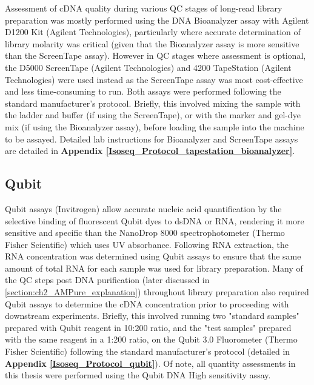 Assessment of cDNA quality during various QC stages of long-read library preparation was mostly performed using the DNA Bioanalyzer assay with Agilent D1200 Kit (Agilent Technologies), particularly where accurate determination of library molarity was critical (given that the Bioanalyzer assay is more sensitive than the ScreenTape assay). However in QC stages where assessment is optional, the D5000 ScreenTape (Agilent Technologies) and 4200 TapeStation (Agilent Technologies) were used instead as the ScreenTape assay was most cost-effective and less time-consuming to run. Both assays were performed following the standard manufacturer's protocol. Briefly, this involved mixing the sample with the ladder and buffer (if using the ScreenTape), or with the marker and gel-dye mix (if using the Bioanalyzer assay), before loading the sample into the machine to be assayed. Detailed lab instructions for Bioanalyzer and ScreenTape assays are detailed in \textbf{Appendix \ref{Isoseq_Protocol_tapestation_bioanalyzer}}.

\subsection{Qubit}
\label{section:ch2_qubit}   
Qubit assays (Invitrogen) allow accurate nucleic acid quantification by the selective binding of fluorescent Qubit dyes to dsDNA or RNA, rendering it more sensitive and specific than the NanoDrop 8000 spectrophotometer (Thermo Fisher Scientific) which uses UV absorbance. Following RNA extraction, the RNA concentration was determined using Qubit assays to ensure that the same amount of total RNA for each sample was used for library preparation. Many of the QC steps post DNA purification (later discussed in \cref{section:ch2_AMPure_explanation}) throughout library preparation also required Qubit assays to determine the cDNA concentration prior to proceeding with downstream experiments. Briefly, this involved running two "standard samples" prepared with Qubit reagent in 10:200 ratio, and the "test samples" prepared with the same reagent in a 1:200 ratio, on the Qubit 3.0 Fluorometer (Thermo Fisher Scientific) following the standard manufacturer's protocol (detailed in \textbf{Appendix  \ref{Isoseq_Protocol_qubit}}). Of note, all quantity assessments in this thesis were performed using the Qubit DNA High sensitivity assay.          

